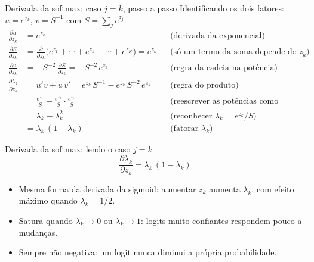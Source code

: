 \documentclass[aspectratio=169,xcolor=dvipsnames]{beamer}
\begin{document}
  \begin{frame}{Derivada da softmax: caso $j = k$, passo a passo}
    Identificando os dois fatores: $u = e^{z_k}$, $v = S^{-1}$ com $S = \sum_{j} e^{z_j}$.
    \begin{align*}
      \frac{\partial u}{\partial z_k} &= e^{z_k}
        &&\text{(derivada da exponencial)} \\
      \frac{\partial S}{\partial z_k} &= \frac{\partial}{\partial z_k}\big(e^{z_1}+\cdots+e^{z_k}+\cdots+e^{z_K}\big) = e^{z_k}
        &&\text{(só um termo da soma depende de $z_k$)} \\
      \frac{\partial v}{\partial z_k} &= -S^{-2}\,\frac{\partial S}{\partial z_k} = -S^{-2}\,e^{z_k}
        &&\text{(regra da cadeia na potência)} \\[0.4em]
      \frac{\partial \lambda_k}{\partial z_k}
        &= u'v + u\,v'
         = e^{z_k}\,S^{-1} - e^{z_k}\,S^{-2}\,e^{z_k}
        &&\text{(regra do produto)} \\
        &= \frac{e^{z_k}}{S} - \frac{e^{z_k}}{S}\cdot\frac{e^{z_k}}{S}
        &&\text{(reescrever as potências como frações)} \\
        &= \lambda_k - \lambda_k^{2}
        &&\text{(reconhecer $\lambda_k = e^{z_k}/S$)} \\
        &= \lambda_k\,(1-\lambda_k)
        &&\text{(fatorar $\lambda_k$)}
    \end{align*}
  \end{frame}

  \begin{frame}{Derivada da softmax: lendo o caso $j = k$}
    \[
      \frac{\partial \lambda_k}{\partial z_k} = \lambda_k\,(1-\lambda_k)
    \]
    \begin{itemize}
      \item Mesma forma da derivada da sigmoid: aumentar $z_k$ aumenta $\lambda_k$,
        com efeito máximo quando $\lambda_k = 1/2$.
      \item Satura quando $\lambda_k \to 0$ ou $\lambda_k \to 1$: logits muito confiantes
        respondem pouco a mudanças.
      \item Sempre não negativa: um logit nunca diminui a própria probabilidade.
    \end{itemize}
  \end{frame}
\end{document}
